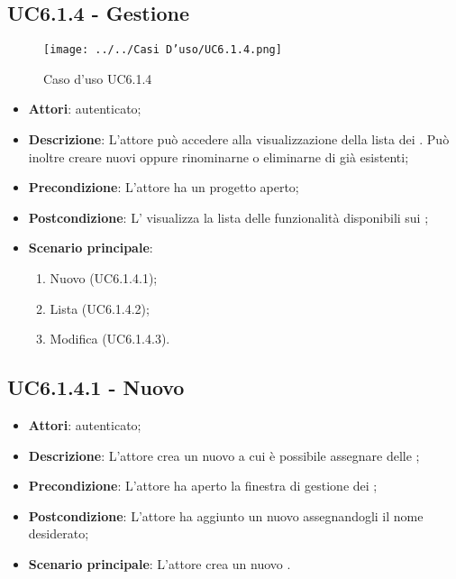 \subsection{UC6.1.4 - Gestione }
\label{ssec:UC6.1.4}
\begin{figure}[h!]
\centering
\texttt{[image: ../../Casi D'uso/UC6.1.4.png]}
\caption{Caso d'uso UC6.1.4}
 \end{figure}
\begin{itemize}
\item \textbf{Attori}:  autenticato;
\item \textbf{Descrizione}: L’attore  può accedere alla visualizzazione della lista dei . Può inoltre creare nuovi  oppure rinominarne o eliminarne di già esistenti;
\item \textbf{Precondizione}: L’attore ha un progetto aperto;
\item \textbf{Postcondizione}: L' visualizza la lista delle funzionalità disponibili sui ;
\item \textbf{Scenario principale}: \begin{enumerate}\item Nuovo  (UC6.1.4.1);\item Lista  (UC6.1.4.2);\item Modifica  (UC6.1.4.3).
 \end{enumerate}
\end{itemize}
\subsection{UC6.1.4.1 - Nuovo }
\label{ssec:UC6.1.4.1}
\begin{itemize}
\item \textbf{Attori}:  autenticato;
\item \textbf{Descrizione}: L'attore crea un nuovo  a cui è possibile assegnare delle ;
\item \textbf{Precondizione}: L'attore ha aperto la finestra di gestione dei ;
\item \textbf{Postcondizione}: L'attore ha aggiunto un nuovo  assegnandogli il nome desiderato;
\item \textbf{Scenario principale}: L'attore crea un nuovo .
\end{itemize}
